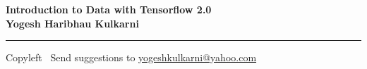 
\graphicspath{{images/}}

\footnotesize


\begin{center}
\Large{\textbf{Introduction to Data with Tensorflow 2.0\\ Yogesh Haribhau Kulkarni}}  
\end{center}

\begin{multicols}{2}

\end{multicols}

\rule{\linewidth}{0.25pt}
\scriptsize
Copyleft \textcopyleft\  Send suggestions to 
\href{http://yati.io}{yogeshkulkarni@yahoo.com}


